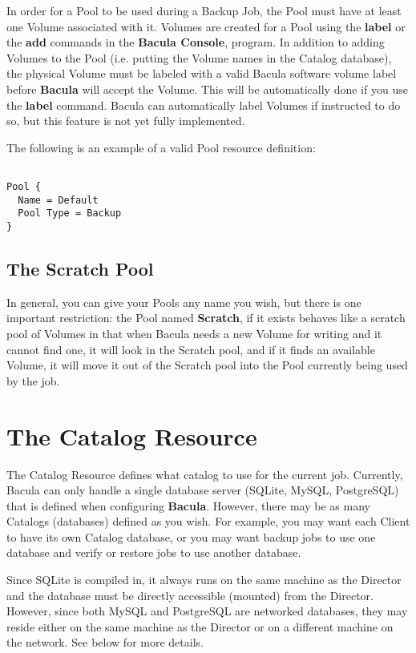 In order for a Pool to be used during a Backup Job, the Pool must have at
least one Volume associated with it.  Volumes are created for a Pool using
the {\bf label} or the {\bf add} commands in the {\bf Bacula Console},
program.  In addition to adding Volumes to the Pool (i.e.  putting the
Volume names in the Catalog database), the physical Volume must be labeled
with a valid Bacula software volume label before {\bf Bacula} will accept
the Volume.  This will be automatically done if you use the {\bf label}
command.  Bacula can automatically label Volumes if instructed to do so,
but this feature is not yet fully implemented.

The following is an example of a valid Pool resource definition: 

\footnotesize
\begin{verbatim}
 
Pool {
  Name = Default
  Pool Type = Backup
}
\end{verbatim}
\normalsize

\subsection{The Scratch Pool}
\label{TheScratchPool}
In general, you can give your Pools any name you wish, but there is one 
important restriction: the Pool named {\bf Scratch}, if it exists behaves 
like a scratch pool of Volumes in that when Bacula needs a new Volume for 
writing and it cannot find one, it will look in the Scratch pool, and if
it finds an available Volume, it will move it out of the Scratch pool into
the Pool currently being used by the job.


\section{The Catalog Resource}
\label{CatalogResource}

The Catalog Resource defines what catalog to use for the current job.
Currently, Bacula can only handle a single database server (SQLite, MySQL,
PostgreSQL) that is defined when configuring {\bf Bacula}.  However, there
may be as many Catalogs (databases) defined as you wish.  For example, you
may want each Client to have its own Catalog database, or you may want
backup jobs to use one database and verify or restore jobs to use another
database. 

Since SQLite is compiled in, it always runs on the same machine
as the Director and the database must be directly accessible (mounted) from
the Director.  However, since both MySQL and PostgreSQL are networked
databases, they may reside either on the same machine as the Director
or on a different machine on the network.  See below for more details.

